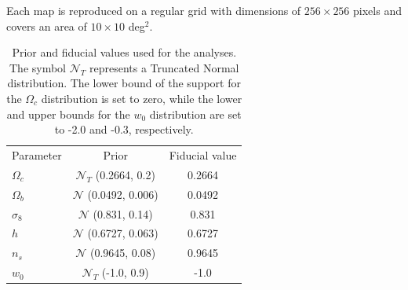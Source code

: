 \documentclass{aa}
\begin{document}
Each map is reproduced on a regular grid with dimensions of $256 \times 256$ pixels and covers an area of $10\times 10$ deg$^2$.

\begin{table}
	\centering
	\caption{ Prior and fiducial values used for the analyses. 
 The symbol $\mathcal{N}_T$ represents a Truncated Normal distribution. The lower bound of the support for the $\Omega_c$ distribution is set to zero, while the lower and upper bounds for the $w_0$ distribution are set to -2.0 and -0.3, respectively.}
	\begin{tabular}{lcc} 
		\hline \hline
		Parameter  & Prior & Fiducial value \\
		$\Omega_c$ & $\mathcal{N}_T$ (0.2664, 0.2) & 0.2664 \\
		$\Omega_b$ & $\mathcal{N}$ (0.0492, 0.006) & 0.0492 \\
		$\sigma_8$ & $\mathcal{N}$ (0.831, 0.14) & 0.831 \\
		$h$ & $\mathcal{N}$ (0.6727, 0.063) & 0.6727\\
		$n_s$ & $\mathcal{N}$ (0.9645, 0.08) & 0.9645 \\
		$w_{0}$ &  $\mathcal{N}_T$ (-1.0, 0.9) &  -1.0 \\
		\hline
	\end{tabular}
	\label{tab:prior}
\end{table}
\end{document}

